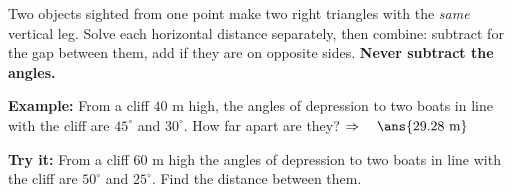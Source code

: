 \documentclass[12pt]{article}
\begin{document}

\begin{formulabox}
Two objects sighted from one point make two right triangles with the \emph{same}
vertical leg. Solve each horizontal distance separately, then combine:
subtract for the gap between them, add if they are on opposite sides.
\textbf{Never subtract the angles.}
\end{formulabox}

\begin{examplebox}
\textbf{Example:} From a cliff $40$ m high, the angles of depression to two
boats in line with the cliff are $45^\circ$ and $30^\circ$. How far apart are
they?
$\Rightarrow\quad \ans{29.28\ \text{m}}$
\end{examplebox}

\begin{tryitbox}
\textbf{Try it:} From a cliff $60$ m high the angles of depression to two boats
in line with the cliff are $50^\circ$ and $25^\circ$. Find the distance between
them.\\[2pt]
\end{tryitbox}
\end{document}
